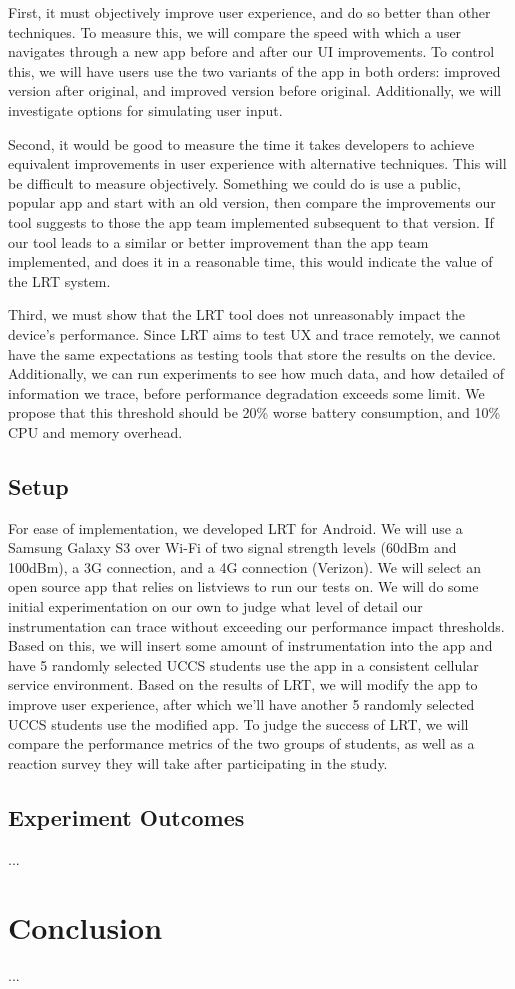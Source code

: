 \documentclass{acm_proc_article-sp}
\begin{document}
First, it must objectively improve user experience, and do so better than other techniques.
To measure this, we will compare the speed with which a user navigates through a new app
before and after our UI improvements. To control this, we will have users use the two variants
of the app in both orders: improved version after original, and improved version before original.
Additionally, we will investigate options for simulating user input.

Second, it would be good to measure the time it takes developers to achieve equivalent
improvements in user experience with alternative techniques. This will be difficult to
measure objectively. Something we could do is use a public, popular app and start with
an old version, then compare the improvements our tool suggests to those the app team
implemented subsequent to that version. If our tool leads to a similar or better improvement
than the app team implemented, and does it in a reasonable time, this would indicate the
value of the LRT system.

Third, we must show that the LRT tool does not unreasonably impact the device's performance.
Since LRT aims to test UX and trace remotely, we cannot have the same expectations as testing
tools that store the results on the device. Additionally, we can run experiments to see how
much data, and how detailed of information we trace, before performance degradation exceeds
some limit. We propose that this threshold should be 20\% worse battery consumption, and 10\%
CPU and memory overhead.

\subsection{Setup}
For ease of implementation, we developed LRT for Android. We will use a Samsung Galaxy S3
over Wi-Fi of two signal strength levels (60dBm and 100dBm), a 3G connection, and a 4G connection
(Verizon). We will select an open source app that relies on listviews to run our tests on. We will
do some initial experimentation on our own to judge what level of detail our instrumentation can
trace without exceeding our performance impact thresholds. Based on this, we will insert some
amount of instrumentation into the app and have 5 randomly selected UCCS students use the app
in a consistent cellular service environment. Based on the results of LRT, we will modify the
app to improve user experience, after which we'll have another 5 randomly selected UCCS students
use the modified app. To judge the success of LRT, we will compare the performance metrics of the
two groups of students, as well as a reaction survey they will take after participating in the
study.

\subsection{Experiment Outcomes}
...

\section{Conclusion}
...

{}

\end{document}
